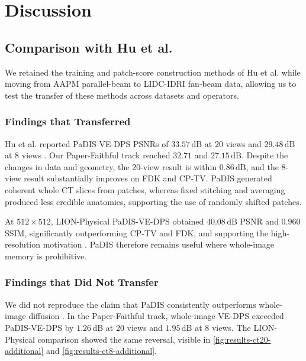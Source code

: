 \ifpdf
    \graphicspath{{Sections/5_discussion_figs/Raster/}{Sections/5_discussion_figs/PDF/}{Sections/5_discussion_figs/}}
\else
    \graphicspath{{Sections/5_discussion_figs/Vector/}{Sections/5_discussion_figs/}}
\fi

\chapter{Discussion}
\label{sec:discussion}

\section{Comparison with Hu et al.}

We retained the training and patch-score construction methods of Hu et al. \cite{hu_learning_2024} while moving from AAPM parallel-beam to LIDC-IDRI fan-beam data, allowing us to test the transfer of these methods across datasets and operators.

\subsection{Findings that Transferred}

Hu et al. reported PaDIS-VE-DPS PSNRs of $33.57\,\mathrm{dB}$ at 20 views and $29.48\,\mathrm{dB}$ at 8 views \cite{hu_learning_2024}. Our Paper-Faithful track reached $32.71$ and $27.15\,\mathrm{dB}$. Despite the changes in data and geometry, the 20-view result is within $0.86\,\mathrm{dB}$, and the 8-view result substantially improves on FDK and CP-TV. PaDIS generated coherent whole CT slices from patches, whereas fixed stitching and averaging produced less credible anatomies, supporting the use of randomly shifted patches.

At $512\times512$, LION-Physical PaDIS-VE-DPS obtained $40.08\,\mathrm{dB}$ PSNR and $0.960$ SSIM, significantly outperforming CP-TV and FDK, and supporting the high-resolution motivation \cite{hu_learning_2024}. PaDIS therefore remains useful where whole-image memory is prohibitive.

\subsection{Findings that Did Not Transfer}

We did not reproduce the claim that PaDIS consistently outperforms whole-image diffusion \cite{hu_learning_2024}. In the Paper-Faithful track, whole-image VE-DPS exceeded PaDIS-VE-DPS by $1.26\,\mathrm{dB}$ at 20 views and $1.95\,\mathrm{dB}$ at 8 views. The LION-Physical comparison showed the same reversal, visible in \autoref{fig:results-ct20-additional} and \autoref{fig:results-ct8-additional}.

